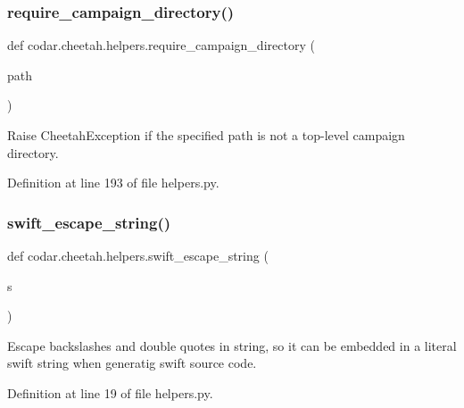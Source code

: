 \subsubsection{\texorpdfstring{require\+\_\+campaign\+\_\+directory()}{require\_campaign\_directory()}}
{\footnotesize\ttfamily def codar.\+cheetah.\+helpers.\+require\+\_\+campaign\+\_\+directory (\begin{DoxyParamCaption}\item[{}]{path }\end{DoxyParamCaption})}

\begin{DoxyVerb}Raise CheetahException if the specified path is not a top-level
campaign directory.\end{DoxyVerb}
 

Definition at line 193 of file helpers.\+py.

\mbox{\label{namespacecodar_1_1cheetah_1_1helpers_a5cdfb8dfb312264379cb2db474d1cb18}} 
\subsubsection{\texorpdfstring{swift\+\_\+escape\+\_\+string()}{swift\_escape\_string()}}
{\footnotesize\ttfamily def codar.\+cheetah.\+helpers.\+swift\+\_\+escape\+\_\+string (\begin{DoxyParamCaption}\item[{}]{s }\end{DoxyParamCaption})}

\begin{DoxyVerb}Escape backslashes and double quotes in string, so it can be
embedded in a literal swift string when generatig swift source code.
\end{DoxyVerb}
 

Definition at line 19 of file helpers.\+py.

